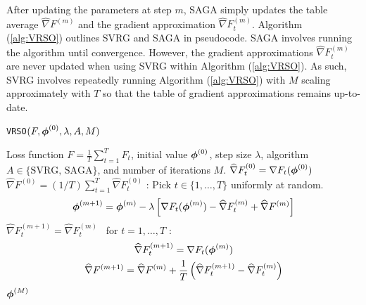 %
After updating the parameters at step $m$, SAGA simply updates the table average $\widehat \nabla F^{(m)}$ and the gradient approximation $\widehat \nabla F_{t}^{(m)}$.
%
%
%
%
Algorithm (\ref{alg:VRSO}) outlines SVRG and SAGA in pseudocode. SAGA involves running the algorithm until convergence. However, the gradient approximations $\widehat \nabla F_{t}^{(m)}$ are never updated when using SVRG within Algorithm (\ref{alg:VRSO}). As such, SVRG involves repeatedly running Algorithm (\ref{alg:VRSO}) with $M$ scaling approximately with $T$ so that the table of gradient approximations remains up-to-date.

\begin{algorithm}
\caption{\texttt{VRSO}$(F,\boldsymbol{\phi}^{(0)},\lambda,A,M)$}\label{alg:VRSO}
\begin{algorithmic}[1]
\Require Loss function $F = \frac{1}{T}\sum_{t=1}^T F_t$, initial value $\boldsymbol{\phi}^{(0)}$, step size $\lambda$, algorithm $A \in \{\text{SVRG, SAGA}\}$, and number of iterations $M$.
%
\vspace{5pt}
 
\State $\widehat \nabla F_{t}^{(0)} = \nabla F_t (\boldsymbol{\phi}^{(0)})$
\EndFor
\State $\widehat \nabla F^{(0)} = (1/T) \sum_{t=1}^T \widehat \nabla F_{t}^{(0)}$
%
:
    \State Pick $t \in \{1,\ldots,T\}$ uniformly at random.
    \State {}
    \begin{gather}
        \boldsymbol{\phi}^{(m+1)} = \boldsymbol{\phi}^{(m)} - \lambda \left[\nabla F_{t}(\boldsymbol{\phi}^{(m)}) - \widehat \nabla F_{t}^{(m)} + \widehat \nabla F^{(m)} \right]
        \label{eqn:SAGA_update0}
    \end{gather}
    \State $\widehat \nabla F_{t}^{(m+1)} = \widehat \nabla F_{t}^{(m)} \enspace$ for $t = 1,\ldots,T$ 
    :
        \begin{gather}
            \widehat \nabla F_{t}^{(m+1)} = \nabla F_{t}(\boldsymbol{\phi}^{(m)}) \\
            \widehat \nabla F^{(m+1)} = \widehat \nabla F^{(m)} + \frac{1}{T} \left(\widehat \nabla F_{t}^{(m+1)} - \widehat \nabla F_{t}^{(m)}\right)
        \end{gather}
    \EndIf
\EndFor
\State \Return $\boldsymbol{\phi}^{(M)}$
\end{algorithmic}
\end{algorithm}




